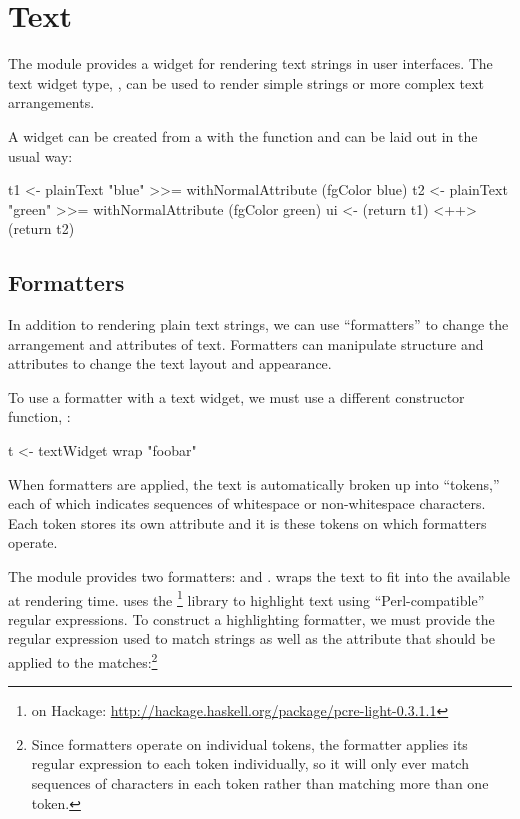 \section{Text}
\label{sec:text}

The  module provides a widget for rendering text strings in
user interfaces.  The text widget type, , can
be used to render simple strings or more complex text arrangements.

A  widget can be created from a  with the
 function and can be laid out in the usual way:

\begin{haskellcode}
 t1 <- plainText "blue" >>= withNormalAttribute (fgColor blue)
 t2 <- plainText "green" >>= withNormalAttribute (fgColor green)
 ui <- (return t1) <++> (return t2)
\end{haskellcode}

\subsection{Formatters}

In addition to rendering plain text strings, we can use ``formatters''
to change the arrangement and attributes of text.  Formatters can
manipulate structure and attributes to change the text layout and
appearance.

To use a formatter with a text widget, we must use a different
constructor function, :

\begin{haskellcode}
 t <- textWidget wrap "foobar"
\end{haskellcode}

When formatters are applied, the text is automatically broken up into
``tokens,'' each of which indicates sequences of whitespace or
non-whitespace characters.  Each token stores its own attribute and it
is these tokens on which formatters operate.

The  module provides two formatters:  and
.   wraps the text to fit into the
 available at rendering time.   uses
the \footnote{ on Hackage:
  \href{http://hackage.haskell.org/package/pcre-light-0.3.1.1}{http://hackage.haskell.org/package/pcre-light-0.3.1.1}}
library to highlight text using ``Perl-compatible'' regular
expressions.  To construct a highlighting formatter, we must provide
the regular expression used to match strings as well as the attribute
that should be applied to the matches:\footnote{Since
  formatters operate on individual tokens, the 
  formatter applies its regular expression to each token individually,
  so it will only ever match sequences of characters in each token
  rather than matching more than one token.}

